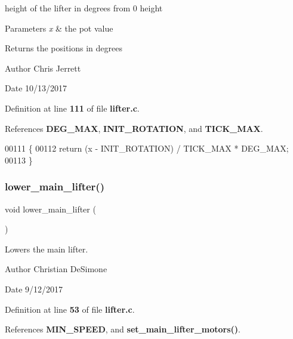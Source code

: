 height of the lifter in degrees from 0 height 


\begin{DoxyParams}{Parameters}
{\em x} & the pot value \\
\hline
\end{DoxyParams}
\begin{DoxyReturn}{Returns}
the positions in degrees 
\end{DoxyReturn}
\begin{DoxyAuthor}{Author}
Chris Jerrett 
\end{DoxyAuthor}
\begin{DoxyDate}{Date}
10/13/2017 
\end{DoxyDate}


Definition at line \textbf{ 111} of file \textbf{ lifter.\+c}.



References \textbf{ D\+E\+G\+\_\+\+M\+AX}, \textbf{ I\+N\+I\+T\+\_\+\+R\+O\+T\+A\+T\+I\+ON}, and \textbf{ T\+I\+C\+K\+\_\+\+M\+AX}.


\begin{DoxyCode}
00111                                         \{
00112   \textcolor{keywordflow}{return} (x - INIT_ROTATION) / TICK_MAX * DEG_MAX;
00113 \}
\end{DoxyCode}
\mbox{\label{lifter_8c_ad36c37086a91046af4e6f619618b7719}} 
\subsubsection{lower\+\_\+main\+\_\+lifter()}
{\footnotesize\ttfamily void lower\+\_\+main\+\_\+lifter (\begin{DoxyParamCaption}{ }\end{DoxyParamCaption})}



Lowers the main lifter. 

\begin{DoxyAuthor}{Author}
Christian De\+Simone 
\end{DoxyAuthor}
\begin{DoxyDate}{Date}
9/12/2017 
\end{DoxyDate}


Definition at line \textbf{ 53} of file \textbf{ lifter.\+c}.



References \textbf{ M\+I\+N\+\_\+\+S\+P\+E\+ED}, and \textbf{ set\+\_\+main\+\_\+lifter\+\_\+motors()}.


